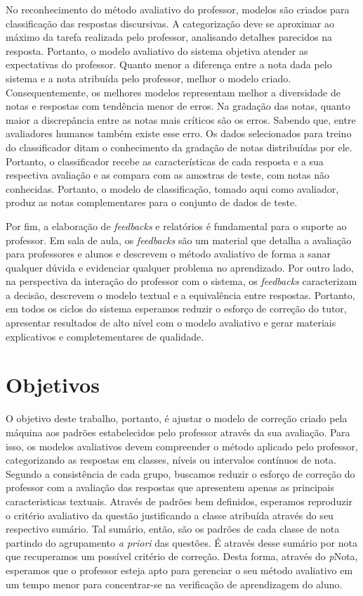No reconhecimento do método avaliativo do professor, modelos são criados para classificação das respostas discursivas. A categorização deve se aproximar ao máximo da tarefa realizada pelo professor, analisando detalhes parecidos na resposta. Portanto, o modelo avaliativo do sistema objetiva atender as expectativas do professor. Quanto menor a diferença entre a nota dada pelo sistema e a nota atribuída pelo professor, melhor o modelo criado. Consequentemente, os melhores modelos representam melhor a diversidade de notas e respostas com tendência menor de erros. Na gradação das notas, quanto maior a discrepância entre as notas mais críticos são os erros. Sabendo que, entre avaliadores humanos também existe esse erro. Os dados selecionados para treino do classificador ditam o conhecimento da gradação de notas distribuídas por ele. Portanto, o classificador recebe as características de cada resposta e a sua respectiva avaliação e as compara com as amostras de teste, com notas não conhecidas. Portanto, o modelo de classificação, tomado aqui como avaliador, produz as notas complementares para o conjunto de dados de teste.

Por fim, a elaboração de \textit{feedbacks} e relatórios é fundamental para o suporte ao professor. Em sala de aula, os \textit{feedbacks} são um material que detalha a avaliação para professores e alunos e descrevem o método avaliativo de forma a sanar qualquer dúvida e evidenciar qualquer problema no aprendizado. Por outro lado, na perspectiva da interação do professor com o sistema, os \textit{feedbacks} caracterizam a decisão, descrevem o modelo textual e a equivalência entre respostas. Portanto, em todos os ciclos do sistema esperamos reduzir o esforço de correção do tutor, apresentar resultados de alto nível com o modelo avaliativo e gerar materiais explicativos e completementares de qualidade.

\section{Objetivos} \label{cap1-objetivos}

O objetivo deste trabalho, portanto, é ajustar o modelo de correção criado pela máquina aos padrões estabelecidos pelo professor através da sua avaliação. Para isso, os modelos avaliativos devem compreender o método aplicado pelo professor, categorizando as respostas em classes, níveis ou intervalos contínuos de nota. Segundo a consistência de cada grupo, buscamos reduzir o esforço de correção do professor com a avaliação das respostas que apresentem apenas as principais caracteristicas textuais. Através de padrões bem definidos, esperamos reproduzir o critério avaliativo da questão justificando a classe atribuída através do seu respectivo sumário. Tal sumário, então, são os padrões de cada classe de nota partindo do agrupamento \textit{a priori} das questões. É através desse sumário por nota que recuperamos um possível critério de correção. Desta forma, através do \textit{p}Nota, esperamos que o professor esteja apto para gerenciar o seu método avaliativo em um tempo menor para concentrar-se na verificação de aprendizagem do aluno.

